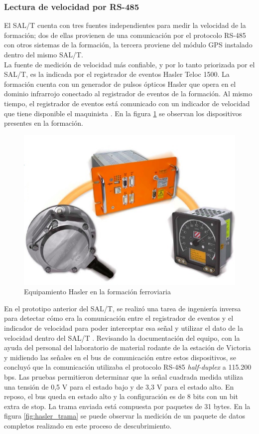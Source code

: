 \subsubsection{Lectura de velocidad por RS-485}

El SAL/T cuenta con tres fuentes independientes para medir la velocidad de la formación; dos de ellas provienen de una comunicación por el protocolo RS-485 con otros sistemas de la formación, la tercera proviene del módulo GPS instalado dentro del mismo SAL/T. \\ 

La fuente de medición de velocidad más confiable, y por lo tanto priorizada por el SAL/T, es la indicada por el registrador de eventos Hasler Teloc 1500. La formación cuenta con un generador de pulsos ópticos Hasler que opera en el dominio infrarrojo conectado al registrador de eventos de la formación. Al mismo tiempo, el registrador de eventos está comunicado con un indicador de velocidad que tiene disponible el maquinista \cite{indicador_velocidad}. En la figura \ref{fig:hasler_teloc} se observan los dispositivos presentes en la formación. 

\begin{figure}[H]
    \centering
    \includegraphics[width = 0.7\linewidth]{img/hasler_teloc.jpeg}
    \caption{Equipamiento Hasler en la formación ferroviaria}
    \label{fig:hasler_teloc}
\end{figure}


En el prototipo anterior del SAL/T, se realizó una tarea de ingeniería inversa para detectar cómo era la comunicación entre el registrador de eventos y el indicador de velocidad para poder interceptar esa señal y utilizar el dato de la velocidad dentro del SAL/T \cite{salt_ivan}. Revisando la documentación del equipo, con la ayuda del personal del laboratorio de material rodante de la estación de Victoria y midiendo las señales en el bus de comunicación entre estos dispositivos, se concluyó que la comunicación utilizaba el protocolo RS-485 \textit{half-duplex} a 115.200 bps. Las pruebas permitieron determinar que la señal cuadrada medida utiliza una tensión de 0,5 V para el estado bajo y de 3,3 V para el estado alto. En reposo, el bus queda en estado alto y la configuración es de 8 bits con un bit extra de stop. La trama enviada está compuesta por paquetes de 31 bytes. En la figura \ref{fig:hasler_trama} se puede observar la medición de un paquete de datos completos realizado en este proceso de descubrimiento. 

